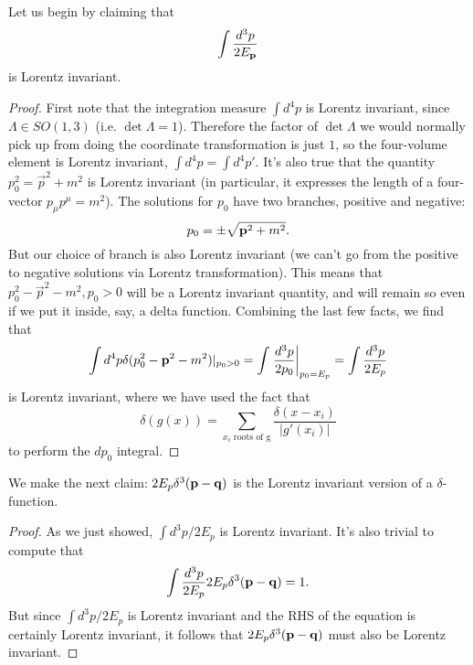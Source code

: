 Let us begin by claiming that
$$\int \frac{d^3p}{2E_{\boldsymbol{\mathbf{p}}}}$$ is Lorentz invariant. 
\begin{proof}
First note that the integration measure $\int d^4p$ is Lorentz invariant, since $\Lambda \in SO(1,3)$ (i.e. $\det \Lambda=1$). Therefore the factor of $\det \Lambda$ we would normally pick up from doing the coordinate transformation is just $1$, so the four-volume element is Lorentz invariant, $\int d^4p = \int d^4 p'$. It's also true that the quantity $p_0^2= \vec{p}^2+m^2$ is Lorentz invariant (in particular, it expresses the length of a four-vector $p_\mu p^\mu = m^2$). The solutions for $p_0$ have two branches, positive and negative:
$$p_0 = \pm \sqrt{\boldsymbol{\mathbf{p}}^2+m^2}.$$
But our choice of branch is also Lorentz invariant (we can't go from the positive to negative solutions via Lorentz transformation). This means that $p_0^2-\vec p^2 -m^2, p_0>0$ will be a Lorentz invariant quantity, and will remain so even if we put it inside, say, a delta function. Combining the last few facts, we find that
$$\int d^4 p \delta(p_0^2-\boldsymbol{\mathbf{p}}^2-m^2)|_{p_0 >0} = \int \left.\frac{d^3 p}{2p_0}\right|_{p_0=E_p}=\int \frac{d^3p}{2E_p}$$
is Lorentz invariant, where we have used the fact that $$\delta(g(x))=\sum_{x_i\text{ roots of g}} \frac{\delta(x-x_i)}{|g'(x_i)|}$$
to perform the $dp_0$ integral.%
\end{proof}

We make the next claim: $2E_p \delta^3(\boldsymbol{\mathbf{p}} - \boldsymbol{\mathbf{q}})$ is the Lorentz invariant version of a $\delta$-function. \begin{proof}
As we just showed, $\int d^3p/2E_p$ is Lorentz invariant. It's also trivial to compute that
$$\int \frac{d^3 p}{2E_p} 2E_p \delta^3(\boldsymbol{\mathbf{p}} - \boldsymbol{\mathbf{q}})=1.$$
But since $\int d^3p/2E_p$ is Lorentz invariant and the RHS of the equation is certainly Lorentz invariant, it follows that $2E_p\delta^3(\boldsymbol{\mathbf{p}}-\boldsymbol{\mathbf{q}})$ must also be Lorentz invariant.
\end{proof}

